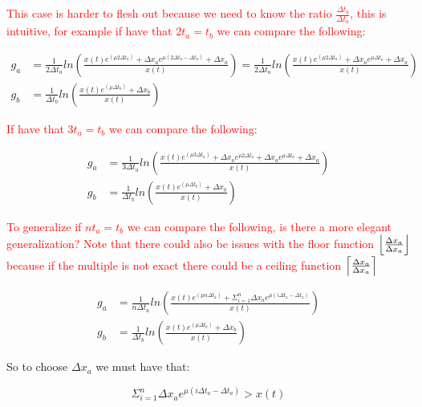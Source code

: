 \documentclass{article}
\DeclarePairedDelimiter\ceil{\lceil}{\rceil}
\DeclarePairedDelimiter\floor{\lfloor}{\rfloor}
\begin{document}
\textcolor{red}{ This case is harder to flesh out because we need to know the ratio $\frac{\Delta t_b}{ \Delta t_a}$, this is intuitive, for example if have that $2t_a=t_b$ we can compare the following:} 

\begin{align*}
g_a&= \frac{1}{2 \Delta t_a} ln 
\left( 
\frac{x(t)e^{(\mu 2\Delta t_a)}+\Delta x_ae^{\mu (2\Delta t_a - \Delta t_a)}+ \Delta x_a}{x(t)}
\right)
= \frac{1}{2 \Delta t_a} ln 
\left( 
\frac{x(t)e^{(\mu 2 \Delta t_a)}+\Delta x_ae^{\mu \Delta t_a }+ \Delta x_a}{x(t)}
\right) \\
g_b&=\frac{1}{\Delta t_b} ln 
\left( 
\frac{x(t)e^{(\mu \Delta t_b)} +\Delta x_b}{x(t)}
\right) 
\end{align*}

\textcolor{red}{ If have that $3t_a=t_b$ we can compare the following:} 

\begin{align*}
g_a&= \frac{1}{3\Delta t_a} ln 
\left( 
\frac{x(t)e^{(\mu 3 \Delta t_a)}+\Delta x_ae^{\mu 2\Delta t_a }+ \Delta x_a e^{\mu \Delta t_a }+\Delta x_a}{x(t)}
\right)   \\
g_b&=\frac{1}{\Delta t_b} ln 
\left( 
\frac{x(t)e^{(\mu \Delta t_b)} +\Delta x_b}{x(t)}
\right) 
\end{align*}

\textcolor{red}{ To generalize if  $nt_a=t_b$ we can compare the following, is there a more elegant generalization? Note that there could also be issues with the floor function $\floor*{\frac{\Delta x_a}{\Delta x_a}}$ because if the multiple is not exact there could be a ceiling function $\ceil*{\frac{\Delta x_a}{\Delta x_a}}$ } 


\begin{align*}
g_a&= \frac{1}{n\Delta t_a} ln 
\left( 
\frac{x(t)e^{(\mu n\Delta t_a)}+\Sigma ^n_{i=1}\Delta x_a e^{\mu (i \Delta t_a - \Delta t_a)}}{x(t)}
\right)   \\
g_b&=\frac{1}{\Delta t_b} ln 
\left( 
\frac{x(t)e^{(\mu \Delta t_b)} +\Delta x_b}{x(t)}
\right) 
\end{align*}

So to choose $\Delta x_a$ we must have that:

\begin{equation*}
\Sigma ^n_{i=1}\Delta x_a e^{\mu (i \Delta t_a - \Delta t_a)}>x(t)
\end{equation*}
\end{document}
